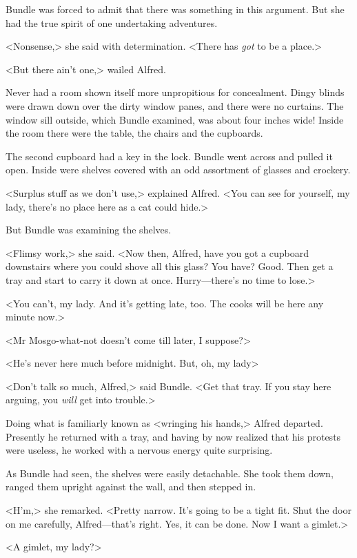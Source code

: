 Bundle was forced to admit that there was something in this argument. But she had the true spirit of one undertaking adventures.

<Nonsense,> she said with determination. <There has \emph{got} to be a place.>

<But there ain't one,> wailed Alfred.

Never had a room shown itself more unpropitious for concealment. Dingy blinds were drawn down over the dirty window panes, and there were no curtains. The window sill outside, which Bundle examined, was about four inches wide! Inside the room there were the table, the chairs and the cupboards.

The second cupboard had a key in the lock. Bundle went across and pulled it open. Inside were shelves covered with an odd assortment of glasses and crockery.

<Surplus stuff as we don't use,> explained Alfred. <You can see for yourself, my lady, there's no place here as a cat could hide.>

But Bundle was examining the shelves.

<Flimsy work,> she said. <Now then, Alfred, have you got a cupboard downstairs where you could shove all this glass? You have? Good. Then get a tray and start to carry it down at once. Hurry—there's no time to lose.>

<You can't, my lady. And it's getting late, too. The cooks will be here any minute now.>

<Mr Mosgo-what-not doesn't come till later, I suppose?>

<He's never here much before midnight. But, oh, my lady\longdash>

<Don't talk so much, Alfred,> said Bundle. <Get that tray. If you stay here arguing, you \emph{will} get into trouble.>

Doing what is familiarly known as <wringing his hands,> Alfred departed. Presently he returned with a tray, and having by now realized that his protests were useless, he worked with a nervous energy quite surprising.

As Bundle had seen, the shelves were easily detachable. She took them down, ranged them upright against the wall, and then stepped in.

<H'm,> she remarked. <Pretty narrow. It's going to be a tight fit. Shut the door on me carefully, Alfred—that's right. Yes, it can be done. Now I want a gimlet.>

<A gimlet, my lady?>

